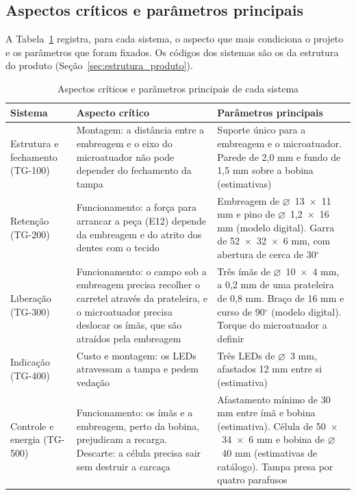 \subsection{Aspectos críticos e parâmetros principais}
\label{subsec:conj_criticos}

A Tabela~\ref{tab:conj_criticos} registra, para cada sistema, o aspecto que mais condiciona o projeto e os parâmetros que foram fixados. Os códigos dos sistemas são os da estrutura do produto (Seção~\ref{sec:estrutura_produto}).

\begin{table}[htbp]
    \centering
    \caption{Aspectos críticos e parâmetros principais de cada sistema}
    \label{tab:conj_criticos}
    \footnotesize
    \renewcommand{\arraystretch}{1.3}
    \begin{tabularx}{\textwidth}{@{}
        >{\RaggedRight\arraybackslash}p{2.6cm}
        >{\RaggedRight\arraybackslash}X
        >{\RaggedRight\arraybackslash}X@{}}
        \toprule
        \textbf{Sistema} & \textbf{Aspecto crítico} & \textbf{Parâmetros principais} \\
        \midrule
        Estrutura e fechamento (TG-100) & Montagem: a distância entre a embreagem e o eixo do microatuador não pode depender do fechamento da tampa & Suporte único para a embreagem e o microatuador. Parede de 2,0 mm e fundo de 1,5 mm sobre a bobina (estimativas) \\
        Retenção (TG-200) & Funcionamento: a força para arrancar a peça (E12) depende da embreagem e do atrito dos dentes com o tecido & Embreagem de $\varnothing$~13~$\times$~11 mm e pino de $\varnothing$~1,2~$\times$~16 mm (modelo digital). Garra de 52~$\times$~32~$\times$~6 mm, com abertura de cerca de 30$^\circ$ \\
        Liberação (TG-300) & Funcionamento: o campo sob a embreagem precisa recolher o carretel através da prateleira, e o microatuador precisa deslocar os ímãs, que são atraídos pela embreagem & Três ímãs de $\varnothing$~10~$\times$~4 mm, a 0,2 mm de uma prateleira de 0,8 mm. Braço de 16 mm e curso de 90$^\circ$ (modelo digital). Torque do microatuador a definir \\
        Indicação (TG-400) & Custo e montagem: os LEDs atravessam a tampa e pedem vedação & Três LEDs de $\varnothing$~3 mm, afastados 12 mm entre si (estimativa) \\
        Controle e energia (TG-500) & Funcionamento: os ímãs e a embreagem, perto da bobina, prejudicam a recarga. Descarte: a célula precisa sair sem destruir a carcaça & Afastamento mínimo de 30 mm entre ímã e bobina (estimativa). Célula de 50~$\times$~34~$\times$~6 mm e bobina de $\varnothing$~40 mm (estimativas de catálogo). Tampa presa por quatro parafusos \\
        \bottomrule
    \end{tabularx}
\end{table}

